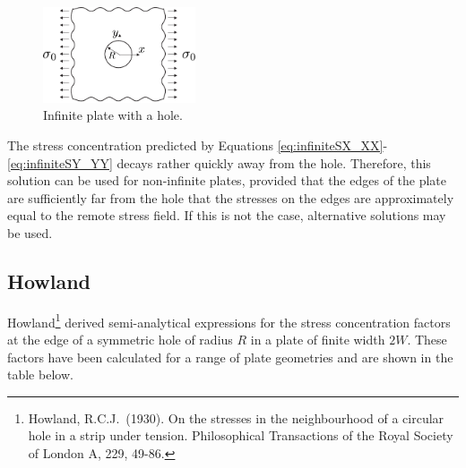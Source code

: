 \documentclass[11pt,a4paper]{article}
\begin{document}
\begin{figure}[htb]
	\centering
	\includegraphics[width=0.4\textwidth]{figs/infinite-plate.pdf}	
	\caption{Infinite plate with a hole.}
	\label{Figure-4}
\end{figure}

The stress concentration predicted by Equations \eqref{eq:infiniteSX_XX}-\eqref{eq:infiniteSY_YY} decays
rather quickly away from the hole. Therefore, this solution can
be used for non-infinite plates, provided that the edges of the
plate are sufficiently far from the hole that the stresses on the
edges are approximately equal to the remote stress field. If this
is not the case, alternative solutions may
be used.

\subsection{Howland}

Howland\footnote{Howland, R.C.J.\ (1930). On the stresses in the
	neighbourhood of a circular hole in a strip under tension.
	Philosophical Transactions of the Royal Society of London A, 229,
	49-86.} derived semi-analytical expressions for the stress
concentration factors at the edge of a symmetric hole of radius
$R$ in a plate of finite width $2W$. These factors have been
calculated for a range of plate geometries and are shown in the
table below.

\vspace{10px}
\end{document}
